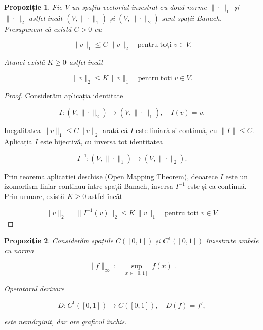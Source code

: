 \documentclass[12pt]{article}
\theoremstyle{definition}
\theoremstyle{plain}
\newtheorem{proposition}{Propoziție}
\begin{document}
\begin{proposition}
Fie $V$ un spațiu vectorial înzestrat cu două norme $\|\cdot\|_1$ și $\|\cdot\|_2$ astfel încât $(V,\|\cdot\|_1)$ și $(V,\|\cdot\|_2)$ sunt spații Banach. Presupunem că există $C>0$ cu


\[
\|v\|_1 \le C \,\|v\|_2 \quad \text{pentru toți } v \in V.
\]


Atunci există $K \ge 0$ astfel încât


\[
\|v\|_2 \le K \,\|v\|_1 \quad \text{pentru toți } v \in V.
\]


\end{proposition}

\begin{proof}
Considerăm aplicația identitate


\[
I : (V,\|\cdot\|_2) \to (V,\|\cdot\|_1), \quad I(v) = v.
\]


Inegalitatea $\|v\|_1 \le C \|v\|_2$ arată că $I$ este liniară și continuă, cu $\|I\| \le C$. Aplicația $I$ este bijectivă, cu inversa tot identitatea


\[
I^{-1} : (V,\|\cdot\|_1) \to (V,\|\cdot\|_2).
\]


Prin teorema aplicației deschise (Open Mapping Theorem), deoarece $I$ este un izomorfism liniar continuu între spații Banach, inversa $I^{-1}$ este și ea continuă. Prin urmare, există $K \ge 0$ astfel încât


\[
\|v\|_2 = \|I^{-1}(v)\|_2 \le K \,\|v\|_1 \quad \text{pentru toți } v \in V.
\]


\end{proof}

\begin{proposition}
Considerăm spațiile $C([0,1])$ și $C^1([0,1])$ înzestrate ambele cu norma


\[
\|f\|_\infty := \sup_{x \in [0,1]} |f(x)|.
\]


Operatorul derivare


\[
D : C^1([0,1]) \to C([0,1]), \quad D(f) = f',
\]


este nemărginit, dar are graficul închis.
\end{proposition}
\end{document}
